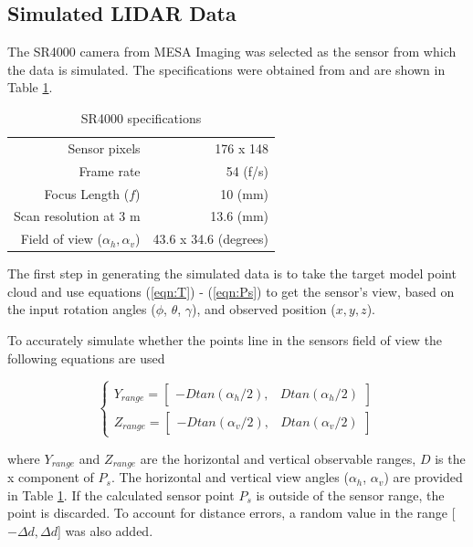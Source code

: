 \documentclass[conference]{IEEEtran}
\begin{document}
	\subsection{Simulated LIDAR Data} 
		The SR4000 camera from MESA Imaging was selected as the sensor from which the data is simulated. The specifications were obtained from \cite{camera_specs} and are shown in Table \ref{tab:sr4000_spec}.

		\begin{table}[htbp]
			\caption{SR4000 specifications} %
			\centering
		\begin{tabular}{rr} %
			\hline\hline %
			Sensor pixels & 176 x 148 \\ %
			Frame rate & 54 (f/s)\\
			Focus Length ($f$) & 10 (mm) \\
			Scan resolution at 3 m & 13.6 (mm)\\
			Field of view ($\alpha_h,\alpha_v$) & 43.6 x 34.6 (degrees) \\[1ex] %
			\hline %
		\end{tabular}
		\label{tab:sr4000_spec}
		\end{table}

		The first step in generating the simulated data is to take the target model point cloud and use equations (\ref{eqn:T}) - (\ref{eqn:Ps}) to get the sensor's view, based on the input rotation angles ($\phi$, $\theta$, $\gamma$), and observed position ($x,y,z$).

		To accurately simulate whether the points line in the sensors field of view the following equations are used

		\begin{equation}
			\label{eqn:field_view_eqs}
			\begin{cases}
				Y_{range} = \begin{bmatrix} -Dtan(\alpha_h/2), & Dtan(\alpha_h/2) \end{bmatrix} \\
				Z_{range} = \begin{bmatrix} -Dtan(\alpha_v/2), & Dtan(\alpha_v/2) \end{bmatrix}
			\end{cases}
		\end{equation}

		where $Y_{range}$ and $Z_{range}$ are the horizontal and vertical observable ranges, $D$ is the x component of $P_s$. The horizontal and vertical view angles ($\alpha_h$, $\alpha_v$) are provided in Table \ref{tab:sr4000_spec}. If the calculated sensor point $P_s$ is outside of the sensor range, the point is discarded. To account for distance errors, a random value in the range [$-\Delta d, \Delta d$] was also added.
		
\end{document}
